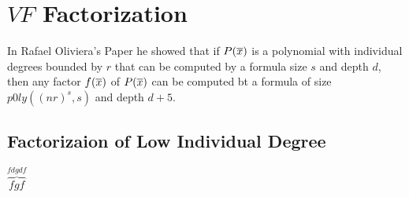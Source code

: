 \documentclass{report}
\begin{document}
\chapter{$VF$ Factorization}

In Rafael Oliviera's Paper \cite{oliveiraFactorsLowIndividual2016} he showed that if $P(\overline{x})$ is a polynomial with individual degrees bounded by $r$ that can be computed by a formula size $s$ and depth $d$, then any factor $f(\overline{x})$ of $P(\overline{x})$ can be computed bt a formula of size $p0ly((nr)^s,s)$ and depth $d+5$.
\section{Factorizaion of Low Individual Degree}
$\overbrace{fgf}^{fdgdf}$
\printbibliography
\end{document}
